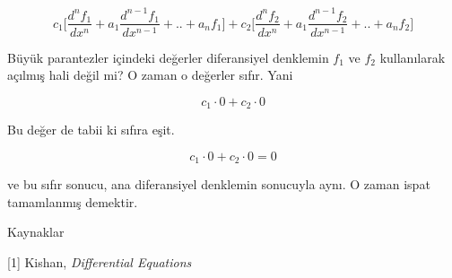 \documentclass[12pt,fleqn]{article}\usepackage{../../common}
\begin{document}
$$ 
c_1 \bigg[
\frac{d^nf_1}{dx^n} + a_1 \frac{d^{n-1}f_1}{dx^{n-1}} + .. + a_n f_1
\bigg] +
c_2 \bigg[
\frac{d^nf_2}{dx^n} + a_1 \frac{d^{n-1}f_2}{dx^{n-1}} + .. + a_n f_2
\bigg]
 $$

Büyük parantezler içindeki değerler diferansiyel denklemin $f_1$ ve $f_2$
kullanılarak açılmış hali değil mi? O zaman o değerler sıfır. Yani

$$ c_1 \cdot 0 + c_2 \cdot 0 $$

Bu değer de tabii ki sıfıra eşit. 

$$ c_1 \cdot 0 + c_2 \cdot 0 = 0$$

ve bu sıfır sonucu, ana diferansiyel denklemin sonucuyla aynı. O zaman ispat
tamamlanmış demektir.

Kaynaklar 

[1] Kishan, {\em Differential Equations}
\end{document}
